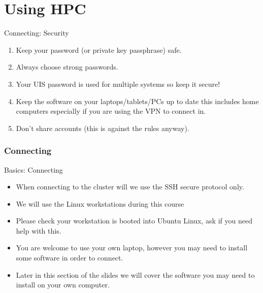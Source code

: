 \part{Using HPC}
\begin{frame}
\partpage
\end{frame}

\begin{frame}{Connecting: Security}
\begin{enumerate}
\item{\alert{Keep your password (or private key passphrase) safe.}}
\pause
\item{\alert{Always choose strong passwords.}}
\pause
\item{\alert{Your UIS password is used for multiple systems so keep it secure!}}
\pause
\item{Keep the software on your laptops/tablets/PCs up to date this includes home computers especially if you are using the VPN to connect in.}
\pause
\item{Don't share accounts (this is against the rules anyway).}
\end{enumerate}
\end{frame}

\section{Connecting}
\begin{frame}{Basics: Connecting}
\begin{itemize}
\item When connecting to the cluster will we use the SSH secure protocol only.
\item We will use the Linux workstations during this course
\item Please check your workstation is booted into Ubuntu Linux, ask if you need help with this.
\item You are welcome to use your own laptop, however you may need to install some software in order to connect.
\item Later in this section of the slides we will cover the software you may need to install on your own computer.
\end{itemize}
\end{frame}

